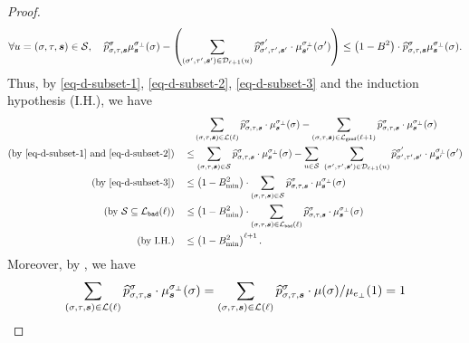 \documentclass[11pt]{article}
\def\!#1{\mathtt{#1}}
\newcommand{\seqS}{\boldsymbol{s}}
\begin{document}
\begin{proof}
\begin{align}\label{eq-d-subset-3}
\forall u=(\sigma,\tau,\seqS)\in \+S, \quad \widehat{p}^{\sigma}_{\sigma,\tau,\seqS}\mu^{\sigma_{\bot}}_{\seqS}(\sigma) - \left(\sum_{(\sigma',\tau',\seqS')\in \+D_{\ell+1}(u)} \widehat{p}^{\sigma'}_{\sigma',\tau',\seqS'}\cdot \mu^{\sigma_{\bot}}_{\seqS'}(\sigma') \right)\leq \left(1 - B^2\right)\cdot\widehat{p}^{\sigma}_{\sigma,\tau,\seqS}\mu^{\sigma_{\bot}}_{\seqS}(\sigma).
\end{align}
Thus, by \eqref{eq-d-subset-1},  \eqref{eq-d-subset-2}, \eqref{eq-d-subset-3} and the induction hypothesis (I.H.), we have
\begin{equation}\label{eq-d-diff}
\begin{aligned}
 &\quad \sum_{(\sigma,\tau, \seqS)\in \+L(\ell)} \widehat{p}^{\sigma}_{\sigma,\tau,\seqS}\cdot \mu^{\sigma_{\bot}}_{\seqS}(\sigma) - \sum_{(\sigma,\tau, \seqS)\in \+L_{\!{good}}(\ell+1)}\widehat{p}^{\sigma}_{\sigma,\tau,\seqS}\cdot \mu^{\sigma_{\bot}}_{\seqS}(\sigma)\\
\left(\text{by \eqref{eq-d-subset-1} and \eqref{eq-d-subset-2}}\right)\quad &\leq \sum_{(\sigma,\tau,\seqS)\in \+S}\widehat{p}^{\sigma}_{\sigma,\tau,\seqS}\cdot \mu^{\sigma_{\bot}}_{\seqS}(\sigma) - \sum_{u\in \+S}\ \sum_{(\sigma',\tau',\seqS')\in \+D_{\ell+1}(u)} \widehat{p}^{\sigma'}_{\sigma',\tau',\seqS'}\cdot \mu^{\sigma_{\bot}}_{\seqS'}(\sigma') \\
\left(\text{by \eqref{eq-d-subset-3}}\right)\quad &\leq
\left( 1 -B_{\min}^2\right)\cdot\sum_{(\sigma,\tau,\seqS)\in \+S}\widehat{p}^{\sigma}_{\sigma,\tau,\seqS}\cdot \mu^{\sigma_{\bot}}_{\seqS}(\sigma)\\
\left(\text{by $\+S\subseteq \+L_{\!{bad}}(\ell)$}\right)
\quad &\leq
\left( 1 -B_{\min}^2\right)\cdot\sum_{(\sigma,\tau,\seqS)\in \+L_{\!{bad}}(\ell)}\widehat{p}^{\sigma}_{\sigma,\tau,\seqS}\cdot \mu^{\sigma_{\bot}}_{\seqS}(\sigma)\\
\left(\text{by I.H.}\right)\quad &\leq \left(1-B_{\min}^2\right)^{\ell+1}.
\end{aligned}
\end{equation}
Moreover, by , we have
\begin{equation}\label{eq-lemma-ratio-identity-transform}
\begin{aligned}
    \sum_{(\sigma,\tau, \seqS)\in \+L(\ell)} \widehat{p}^{\sigma}_{\sigma,\tau,\seqS}\cdot \mu^{\sigma_{\bot}}_{\seqS}(\sigma) &= \sum_{(\sigma,\tau, \seqS)\in \+L(\ell)}\widehat{p}^{\sigma}_{\sigma,\tau,\seqS}\cdot \mu(\sigma)/\mu_{e_{\bot}}(1) = 1 \\

\end{aligned}
\end{equation}
\end{proof}
\end{document}
